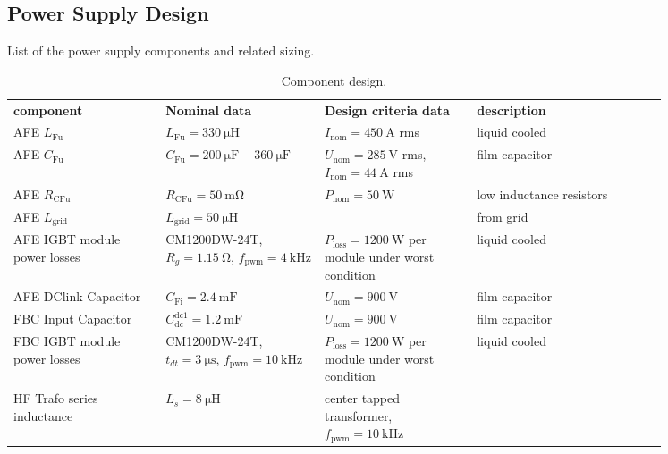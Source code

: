 \documentclass[12pt,a4paper]{scrartcl}
\begin{document}
\begin{onehalfspace}
\section{Power Supply Design}\label{sec:topology}

List of the power supply components and related sizing. 

 \begin{center}	
	\onehalfspacing
	\begin{longtable}{p{0.2\linewidth}|p{0.2\linewidth}|p{0.2\linewidth}|p{0.25\linewidth}}
		\captionsetup{width=0.65\textwidth, font=small}
		\caption{Component design.}
		\label{table:design} \\
		\toprule
		\textbf{component} & \textbf{Nominal data}  & \textbf{Design criteria data}  & \textbf{description} \\
		\midrule
		AFE $L_\text{Fu}$ & $L_\text{Fu} = \SI{330}{\micro\henry}$ & $I_\text{nom} = \SI{450}{\ampere}$ rms & liquid cooled \\	
		\midrule	
		AFE $C_\text{Fu}$ & $C_\text{Fu} = \SI{200}{\micro\farad}-\SI{360}{\micro\farad}$ & $U_\text{nom} = \SI{285}{\volt}$ rms, $I_\text{nom} = \SI{44}{\ampere}$ rms & film capacitor \\		
		\midrule
		AFE $R_\text{CFu}$ & $R_\text{CFu} = \SI{50}{\milli\ohm}$ & $P_\text{nom} = \SI{50}{\watt}$ & low inductance resistors \\
		\midrule
		AFE $L_\text{grid}$ & $L_\text{grid} = \SI{50}{\micro\henry}$ &  & from grid \\
		\midrule
		AFE IGBT module power losses & CM1200DW-24T, $R_g = \SI{1.15}{\ohm}$, $f_\text{pwm} = \SI{4}{\kilo\hertz}$ & $P_\text{loss} = \SI{1200}{\watt}$ per module under worst condition  & liquid cooled \\
		\midrule
		AFE DClink Capacitor & $C_\text{Fi} = \SI{2.4}{\milli\farad}$ & $U_\text{nom} = \SI{900}{\volt}$  & film capacitor \\
		\midrule
		FBC Input Capacitor & $C_\text{dc}^\text{dc1} = \SI{1.2}{\milli\farad}$ & $U_\text{nom} = \SI{900}{\volt}$  & film capacitor \\
		\midrule
		FBC IGBT module power losses & CM1200DW-24T, $t_{dt} = \SI{3}{\micro\second}$, $f_\text{pwm} = \SI{10}{\kilo\hertz}$ & $P_\text{loss} = \SI{1200}{\watt}$ per module under worst condition & liquid cooled \\
		\midrule
		HF Trafo series inductance & $L_s = \SI{8}{\micro\henry}$ & center tapped transformer, $f_\text{pwm} = \SI{10}{\kilo\hertz}$ & \\

\end{longtable}
\end{center}
\end{onehalfspace}
\end{document}
